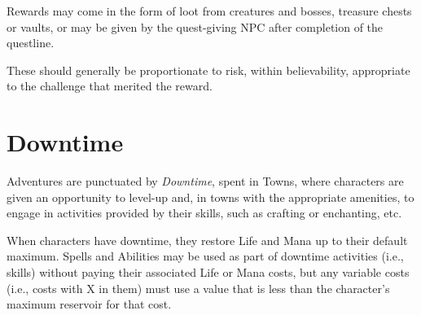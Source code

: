 \vspace{0.4em}

Rewards may come in the form of loot from creatures and bosses, treasure chests or vaults,
or may be given by the quest-giving NPC after completion of the questline.

\vspace{0.4em}

These should generally be proportionate to risk, within believability, 
appropriate to the challenge that merited the reward.


\section{Downtime}
Adventures are punctuated by \textit{Downtime}, spent in Towns, 
where characters are given an opportunity to level-up and,
in towns with the appropriate amenities, to engage in activities provided by their skills,
such as crafting or enchanting, etc.

\vspace{0.4em}

When characters have downtime, they restore Life and Mana up to their default maximum.
Spells and Abilities may be used as part of downtime activities (i.e., skills) 
without paying their associated Life or Mana costs, 
but any variable costs (i.e., costs with X in them) must use a value that is 
less than the character's maximum reservoir for that cost.

